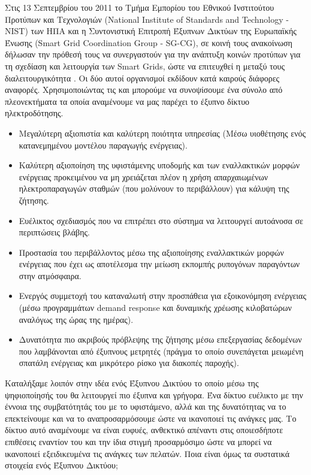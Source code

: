 \documentclass[12pt, a4paper, oneside]{report}
\begin{document}
Στις 13 Σεπτεμβρίου του 2011 το Τμήμα Εμπορίου του Εθνικού Ινστιτούτου Προτύπων και Τεχνολογιών (National Institute of Standards and Technology - NIST) των ΗΠΑ και η Συντονιστική Επιτροπή Έξυπνων Δικτύων της Ευρωπαϊκής Ένωσης (Smart Grid Coordination Group - SG-CG), σε κοινή τους ανακοίνωση δήλωσαν την πρόθεσή τους να συνεργαστούν για την ανάπτυξη κοινών προτύπων για τη σχεδίαση και λειτουργία των Smart Grids, ώστε να επιτευχθεί η μεταξύ τους διαλειτουργικότητα \cite{18,19}. Οι δύο αυτοί οργανισμοί εκδίδουν κατά καιρούς διάφορες αναφορές. Χρησιμοποιώντας τις \cite{20} και \cite{21} μπορούμε να συνοψίσουμε ένα σύνολο από πλεονεκτήματα τα οποία αναμένουμε να μας παρέχει το έξυπνο δίκτυο ηλεκτροδότησης.
\begin{itemize}
\item Μεγαλύτερη αξιοπιστία και καλύτερη ποιότητα υπηρεσίας (Μέσω υιοθέτησης ενός κατανεμημένου μοντέλου παραγωγής ενέργειας).
\item Καλύτερη αξιοποίηση της υφιστάμενης υποδομής και των εναλλακτικών μορφών ενέργειας προκειμένου να μη χρειάζεται πλέον η χρήση απαρχαιωμένων ηλεκτροπαραγωγών σταθμών (που μολύνουν το περιβάλλουν) για κάλυψη της ζήτησης.
\item Ευέλικτος σχεδιασμός που να επιτρέπει στο σύστημα να λειτουργεί αυτοάνοσα σε περιπτώσεις βλάβης.
\item Προστασία του περιβάλλοντος μέσω της αξιοποίησης εναλλακτικών μορφών ενέργειας που έχει ως αποτέλεσμα την μείωση εκπομπής ρυπογόνων παραγόντων στην ατμόσφαιρα.
\item Ενεργός συμμετοχή του καταναλωτή στην προσπάθεια για εξοικονόμηση ενέργειας (μέσω προγραμμάτων demand response και δυναμικής χρέωσης κιλοβατώρων αναλόγως της ώρας της ημέρας).
\item Δυνατότητα πιο ακριβούς πρόβλεψης της ζήτησης μέσω επεξεργασίας δεδομένων που λαμβάνονται από έξυπνους μετρητές (πράγμα το οποίο συνεπάγεται μειωμένη σπατάλη ενέργειας και μικρότερο ρίσκο για διακοπές παροχής).
\end{itemize}

Καταλήξαμε λοιπόν στην ιδέα ενός Έξυπνου Δικτύου το οποίο μέσω της ψηφιοποίησής του θα λειτουργεί πιο έξυπνα και γρήγορα. Ένα δίκτυο ευέλικτο με την έννοια της συμβατότητάς του με το υφιστάμενο, αλλά και της δυνατότητας να το επεκτείνουμε και να το αναπροσαρμόσουμε ώστε να ικανοποιεί τις ανάγκες μας. Το δίκτυο αυτό αναμένουμε να είναι ευφυές, ανθεκτικό απέναντι στις οποιεσδήποτε επιθέσεις εναντίον του και την ίδια στιγμή προσαρμόσιμο ώστε να μπορεί να ικανοποιεί εξειδικευμένα τις ανάγκες των πελατών. Ποια είναι όμως τα συστατικά στοιχεία ενός Έξυπνου Δικτύου;
\end{document}

